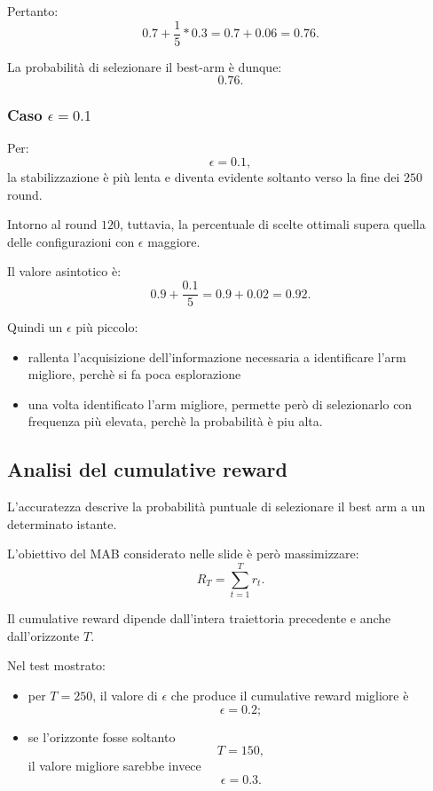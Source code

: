 Pertanto:
\[
0.7+\frac{1}{5} * 0.3
=
0.7+0.06
=
0.76.
\]

La probabilità di selezionare il best-arm è dunque:
\[
0.76.
\]

\subsubsection{Caso $\epsilon=0.1$}

Per:
\[
\epsilon=0.1,
\]
la stabilizzazione è più lenta e diventa evidente soltanto verso la fine dei $250$ round.

Intorno al round $120$, tuttavia, la percentuale di scelte ottimali supera quella delle configurazioni con $\epsilon$ maggiore.

Il valore asintotico è:
\[
0.9+\frac{0.1}{5}
=
0.9+0.02
=
0.92.
\]

Quindi un $\epsilon$ più piccolo:
\begin{itemize}
    \item rallenta l'acquisizione dell'informazione necessaria a identificare l'arm migliore, perchè si fa poca esplorazione
    \item una volta identificato l'arm migliore, permette però di selezionarlo con frequenza più elevata, perchè la probabilità è piu alta.
\end{itemize}

\newpage

\subsection{Analisi del cumulative reward}

L'accuratezza descrive la probabilità puntuale di selezionare il best arm a un determinato istante.

L'obiettivo del MAB considerato nelle slide è però massimizzare:
\[
R_T=\sum_{t=1}^{T}r_t.
\]

Il cumulative reward dipende dall'intera traiettoria precedente e anche dall'orizzonte $T$.

Nel test mostrato:
\begin{itemize}
    \item per $T=250$, il valore di $\epsilon$ che produce il cumulative reward migliore è
    \[
    \epsilon=0.2;
    \]
    \item se l'orizzonte fosse soltanto
    \[
    T=150,
    \]
    il valore migliore sarebbe invece
    \[
    \epsilon=0.3.
    \]
\end{itemize}

